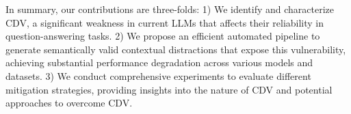 In summary, our contributions are three-folds: 1) We identify and characterize CDV, a significant weakness in current LLMs that affects their reliability in question-answering tasks. 2) We propose an efficient automated pipeline to generate semantically valid contextual distractions that expose this vulnerability, achieving substantial performance degradation across various models and datasets. 3) We conduct comprehensive experiments to evaluate different mitigation strategies, providing insights into the nature of CDV and potential approaches to overcome CDV. %

